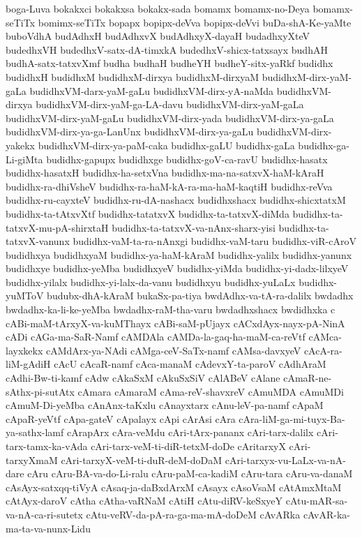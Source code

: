 {boga-Luva
bokakxci
bokakxsa
bokakx-sada
bomamx
bomamx-no-Deya
bomamx-seTiTx
bomimx-seTiTx
bopapx
bopipx-deVva
bopipx-deVvi
buDa-shA-Ke-yaMte
buboVdhA
budAdhxH
budAdhxvX
budAdhxyX-dayaH
budadhxyXteV
budedhxVH
budedhxV-satx-dA-timxkA
budedhxV-shicx-tatxsayx
budhAH
budhA-satx-tatxvXmf
budha
budhaH
budheYH
budheY-sitx-yaRkf
budidhx
budidhxH
budidhxM
budidhxM-dirxya
budidhxM-dirxyaM
budidhxM-dirx-yaM-gaLa
budidhxVM-darx-yaM-gaLu
budidhxVM-dirx-yA-naMda
budidhxVM-dirxya
budidhxVM-dirx-yaM-ga-LA-davu
budidhxVM-dirx-yaM-gaLa
budidhxVM-dirx-yaM-gaLu
budidhxVM-dirx-yada
budidhxVM-dirx-ya-gaLa
budidhxVM-dirx-ya-ga-LanUnx
budidhxVM-dirx-ya-gaLu
budidhxVM-dirx-yakekx
budidhxVM-dirx-ya-paM-caka
budidhx-gaLU
budidhx-gaLa
budidhx-ga-Li-giMta
budidhx-gapupx
budidhxge
budidhx-goV-ca-ravU
budidhx-hasatx
budidhx-hasatxH
budidhx-ha-setxVna
budidhx-ma-na-satxvX-haM-kAraH
budidhx-ra-dhiVsheV
budidhx-ra-haM-kA-ra-ma-haM-kaqtiH
budidhx-reVva
budidhx-ru-cayxteV
budidhx-ru-dA-nashacx
budidhxshacx
budidhx-shicxtatxM
budidhx-ta-tAtxvXtf
budidhx-tatatxvX
budidhx-ta-tatxvX-diMda
budidhx-ta-tatxvX-mu-pA-shirxtaH
budidhx-ta-tatxvX-va-nAnx-sharx-yisi
budidhx-ta-tatxvX-vanunx
budidhx-vaM-ta-ra-nAnxgi
budidhx-vaM-taru
budidhx-viR-cAroV
budidhxya
budidhxyaM
budidhx-ya-haM-kAraM
budidhx-yalilx
budidhx-yanunx
budidhxye
budidhx-yeMba
budidhxyeV
budidhx-yiMda
budidhx-yi-dadx-lilxyeV
budidhx-yilalx
budidhx-yi-lalx-da-vanu
budidhxyu
budidhx-yuLaLx
budidhx-yuMToV
budubx-dhA-kAraM
bukaSx-pa-tiya
bwdAdhx-va-tA-ra-dalilx
bwdadhx
bwdadhx-ka-li-ke-yeMba
bwdadhx-raM-tha-varu
bwdadhxshacx
bwdidhxka
c
cABi-maM-tArxyX-va-kuMThayx
cABi-saM-pUjayx
cACxdAyx-nayx-pA-NinA
cADi
cAGa-ma-SaR-Namf
cAMDAla
cAMDa-la-gaq-ha-maM-ca-reVtf
cAMca-layxkekx
cAMdArx-ya-NAdi
cAMga-ceV-SaTx-namf
cAMsa-davxyeV
cAcA-ra-liM-gAdiH
cAcU
cAcaR-namf
cAca-manaM
cAdevxY-ta-paroV
cAdhAraM
cAdhi-Bw-ti-kamf
cAdw
cAkaSxM
cAkuSxSiV
cAlABeV
cAlane
cAmaR-ne-sAthx-pi-sutAtx
cAmara
cAmaraM
cAma-reV-shavxreV
cAmuMDA
cAmuMDi
cAmuM-Di-yeMba
cAnAnx-taKxlu
cAnayxtarx
cAnu-leV-pa-namf
cApaM
cApaR-yeVtf
cApa-gateV
cApalayx
cApi
cArAsi
cAra
cAra-liM-ga-mi-tuyx-Ba-ya-sathx-lamf
cArapArx
cAra-veMdu
cAri-tArx-pananx
cAri-tarx-dalilx
cAri-tarx-tamx-ka-vAda
cAri-tarx-veM-ti-diR-tetxM-doDe
cAritarxyX
cAri-tarxyXmaM
cAri-tarxyX-veM-ti-duR-deM-doDaM
cAri-tarxyx-vu-LaLx-va-nA-dare
cAru
cAru-BA-va-do-Li-ralu
cAru-paM-ca-kadiM
cAru-tara
cAru-va-danaM
cAsAyx-satxqq-tiVyA
cAsaq-ja-daBxdArxM
cAsayx
cAsoVsaM
cAtAmxMtaM
cAtAyx-daroV
cAtha
cAtha-vaRNaM
cAtiH
cAtu-diRV-keSxyeY
cAtu-mAR-sa-va-nA-ca-ri-sutetx
cAtu-veRV-da-pA-ra-ga-ma-mA-doDeM
cAvARka
cAvAR-ka-ma-ta-va-nunx-Lidu
}
